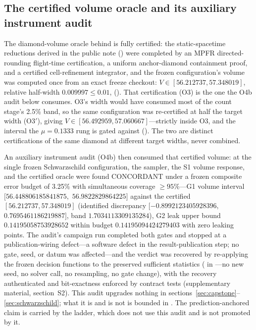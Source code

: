 \subsection{The certified volume oracle and its auxiliary instrument audit}\label{sec:oracle}

The diamond-volume oracle behind  is fully certified: the
static-spacetime reductions derived in the public note
() were
completed by an MPFR directed-rounding flight-time certification, a uniform
anchor-diamond containment proof, and a certified cell-refinement integrator,
and the frozen configuration's volume was computed once from an exact freeze
checkout: $V \in [56.212737, 57.348019]$, relative half-width
$0.009997 \le 0.01$, 
(). That certification
(O3) is the one the O4b audit below consumes. O3's width would have consumed
most of the  count stage's 2.5\% band, so the same
configuration was re-certified at half the target width (O3$'$), giving
$V \in [56.492959, 57.060667]$---strictly inside O3, and the interval the
$\mu = 0.1333$ rung is gated against
(). The two are
distinct certifications of the same diamond at different target widths, never
combined.

An auxiliary instrument audit (O4b) then consumed that certified volume: at
the single frozen Schwarzschild configuration, the sampler, the S1 volume
response, and the certified oracle were found CONCORDANT under a frozen
composite error budget of 3.25\% with simultaneous coverage $\ge 95\%$---G1
volume interval $[56.448806185841875,$ $56.9822829864225]$ against the
certified $[56.212737, 57.348019]$ (identified discrepancy
$[-0.8992123405928396,$ $0.7695461186219887]$, band $1.7034113309135284$), G2
leak upper bound $0.14195058753928652$ within budget $0.14195094424279403$
with zero leaking points. The audit's campaign run completed both gates and
stopped at a publication-wiring defect---a software defect in the
result-publication step; no gate, seed, or datum was affected---and the
verdict was recovered by re-applying the frozen decision functions to the
preserved sufficient statistics
( in
---no new seed, no solver call,
no resampling, no gate change), with the recovery authenticated and
bit-exactness enforced by contract tests (supplementary material,
section~S2).
This audit upgrades nothing in
sections~\ref{sec:capstone}--\ref{sec:schwarzschild}; what it is and is not
is bounded in . The prediction-anchored claim is carried by
the  ladder, which does not use this audit and is not
promoted by it.
